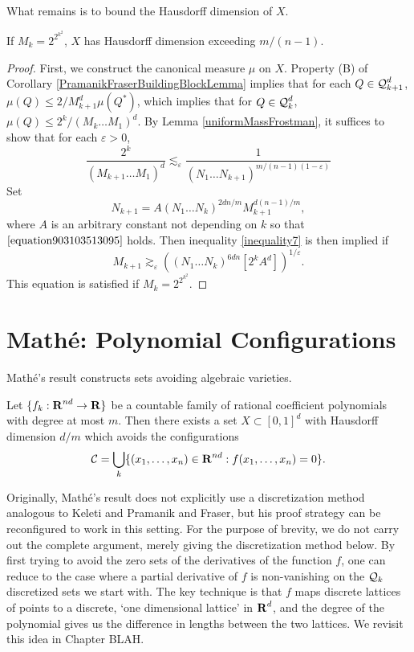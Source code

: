 What remains is to bound the Hausdorff dimension of $X$.

\begin{theorem}
    If $M_k = 2^{2^{k^2}}$, $X$ has Hausdorff dimension exceeding $m/(n-1)$.
\end{theorem}
\begin{proof}
    First, we construct the canonical measure $\mu$ on $X$. Property (B) of Corollary \ref{PramanikFraserBuildingBlockLemma} implies that for each $Q \in \operatorname{\mathcal{Q}}_{k+1}^d$, $\mu(Q) \leq 2/M_{k+1}^d \mu(Q^*)$, which implies that for $Q \in \operatorname{\mathcal{Q}}_k^d$, $\mu(Q) \leq 2^k / (M_k \dots M_1)^d$. By Lemma \ref{uniformMassFrostman}, it suffices to show that for each $\varepsilon > 0$,
    \begin{equation}\label{inequality7} \frac{2^k}{(M_{k+1} \dots M_1)^d} \lesssim_\varepsilon \frac{1}{(N_1 \dots N_{k+1})^{m/(n-1)(1 - \varepsilon)}} \end{equation}
    Set
    \[ N_{k+1} = A (N_1 \dots N_k)^{2dn/m} M_{k+1}^{d(n-1)/m}, \]
    where $A$ is an arbitrary constant not depending on $k$ so that $\eqref{equation903103513095}$ holds. Then inequality \eqref{inequality7} is then implied if
    \[ M_{k+1} \gtrsim_\varepsilon \left( (N_1 \dots N_k)^{6dn} [2^k A^d] \right)^{1/\varepsilon}. \]
    This equation is satisfied if $M_k = 2^{2^{k^2}}$.
\end{proof}

\section{Math\'{e}: Polynomial Configurations}

Math\'{e}'s result constructs sets avoiding algebraic varieties.

\begin{theorem}[Math\'{e}]
    Let $\{ f_k: \operatorname{\mathbf{R}}^{nd} \to \mathbf{R} \}$ be a countable family of rational coefficient polynomials with degree at most $m$. Then there exists a set $X \subset [0,1]^d$ with Hausdorff dimension $d/m$ which avoids the configurations
    \[ \operatorname{\mathcal{C}} = \bigcup_k \{ (x_1, \dots, x_n) \in \operatorname{\mathbf{R}}^{nd} : f(x_1, \dots, x_n) = 0 \}. \]
\end{theorem}

Originally, Math\'{e}'s result does not explicitly use a discretization method analogous to Keleti and Pramanik and Fraser, but his proof strategy can be reconfigured to work in this setting. For the purpose of brevity, we do not carry out the complete argument, merely giving the discretization method below. By first trying to avoid the zero sets of the derivatives of the function $f$, one can reduce to the case where a partial derivative of $f$ is non-vanishing on the $\operatorname{\mathcal{Q}}_k$ discretized sets we start with. The key technique is that $f$ maps discrete lattices of points to a discrete, `one dimensional lattice' in $\operatorname{\mathbf{R}}^d$, and the degree of the polynomial gives us the difference in lengths between the two lattices. We revisit this idea in Chapter BLAH.

